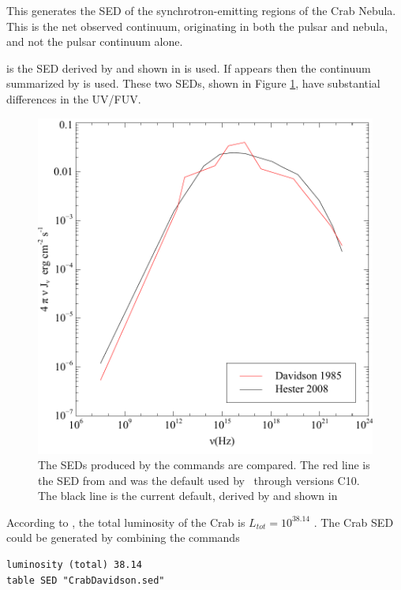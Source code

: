 \noindent This generates the SED of the synchrotron-emitting
regions of the Crab Nebula.  
This is the net observed continuum, originating in both the pulsar and
nebula, and not the pulsar continuum alone.

 is the SED derived by 
\cite{Atoyan.A96On-the-mechanisms-of-gamma-radiation-in-the-Crab}
and shown in \citet{Hester.J08The-Crab-Nebula:-An-Astrophysical-Chimera}
is used.
If  appears then
the continuum summarized by
\citet{Davidson1985} is used.
These two SEDs,
shown in Figure \ref{fig:CrabSED}, 
have substantial differences in the UV/FUV.

\begin{figure}
\centering
\includegraphics{CrabSED}
\caption[Crab Nebula SED]
{\label{fig:CrabSED}The SEDs produced by the  
commands are compared.
The red line is the SED from \citet{Davidson1985} and 
was the default used
by \Cloudy\ through versions C10.
The black line is the current default, derived by 
\cite{Atoyan.A96On-the-mechanisms-of-gamma-radiation-in-the-Crab}
and shown in \citet{Hester.J08The-Crab-Nebula:-An-Astrophysical-Chimera}}
\end{figure}

According to \citet{Davidson1985}, the total luminosity of the Crab is
$L_{tot} = 10^{38.14}$ \ergps.
The Crab SED could be generated by combining
the commands
\begin{verbatim}
luminosity (total) 38.14
table SED "CrabDavidson.sed"
\end{verbatim}

